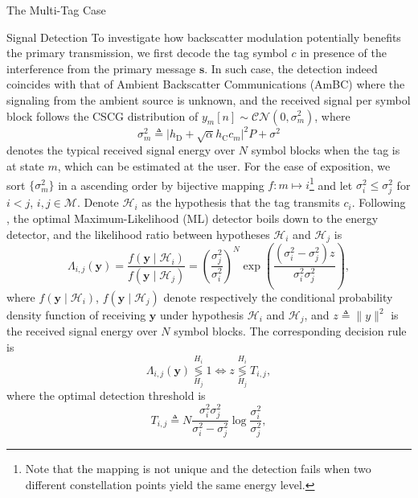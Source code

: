 \documentclass[journal]{IEEEtran}
\begin{document}
\begin{section}{The Multi-Tag Case}
\begin{subsection}{Signal Detection}
			To investigate how backscatter modulation potentially benefits the primary transmission, we first decode the tag symbol $c$ in presence of the interference from the primary message $\boldsymbol{s}$. In such case, the detection indeed coincides with that of Ambient Backscatter Communications (AmBC) where the signaling from the ambient source is unknown, and the received signal per symbol block follows the CSCG distribution of $y_m[n] \sim \mathcal{CN}(0,\sigma_m^2)$, where
			\begin{equation}
				\sigma_m^2 \triangleq \lvert h_{\mathrm{D}} + \sqrt{\alpha} h_{\mathrm{C}} c_m \rvert^2 P + \sigma^2
				\label{eq:typical_energy}
			\end{equation}
			denotes the typical received signal energy over $N$ symbol blocks when the tag is at state $m$, which can be estimated at the user. For the ease of exposition, we sort $\{\sigma_m^2\}$ in a ascending order by bijective mapping $f \colon m \mapsto i$\footnote{Note that the mapping is not unique and the detection fails when two different constellation points yield the same energy level.} and let $\sigma_i^2 \le \sigma_j^2$ for $i < j$, $i,j \in \mathcal{M}$. Denote $\mathcal{H}_i$ as the hypothesis that the tag transmits $c_i$. Following \cite{Qian2019}, the optimal Maximum-Likelihood (ML) detector boils down to the energy detector, and the likelihood ratio between hypotheses $\mathcal{H}_i$ and $\mathcal{H}_j$ is
			\begin{equation}
				\Lambda_{i, j}(\boldsymbol{y}) = \frac{f(\boldsymbol{y} \mid \mathcal{H}_i)}{f(\boldsymbol{y} \mid \mathcal{H}_j)} = \left( \frac{\sigma_j^2}{\sigma_i^2} \right)^N \exp \left( \frac{(\sigma_i^2 - \sigma_j^2) z}{\sigma_i^2 \sigma_j^2} \right),
			\end{equation}
			where $f(\boldsymbol{y} \mid \mathcal{H}_i)$, $f(\boldsymbol{y} \mid \mathcal{H}_j)$ denote respectively the conditional probability density function of receiving $\boldsymbol{y}$ under hypothesis $\mathcal{H}_i$ and $\mathcal{H}_j$, and $z \triangleq \lVert y \rVert^2$ is the received signal energy over $N$ symbol blocks. The corresponding decision rule is
			\begin{equation}
				\Lambda_{i, j}(\boldsymbol{y}) \underset{H_j}{\overset{H_i}{\lessgtr}} 1 \iff z \underset{H_j}{\overset{H_i}{\lessgtr}} T_{i, j},
			\end{equation}
			where the optimal detection threshold is
			\begin{equation}
				T_{i, j} \triangleq N \frac{\sigma_i^2 \sigma_j^2}{\sigma_i^2 - \sigma_j^2} \log \frac{\sigma_i^2}{\sigma_j^2},

\end{equation}
\end{subsection}
\end{section}
\end{document}
